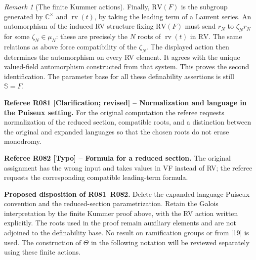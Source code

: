 \documentclass[12pt]{amsart}
\theoremstyle{remark}
\newtheorem{rem}[lem]{Remark}
\newcommand{\C}{\mathds{C}}
\newcommand{\rv}{\operatorname{rv}}
\newcommand{\RV}{\mathrm{RV}}
\newcommand{\Sbase}{\mathbb S}
\numberwithin{equation}{section}
\begin{document}
{\begin{rem}[The finite Kummer actions]
Finally, $\RV(F)$ is the subgroup generated by
$\C^\times$ and $\rv(t)$, by taking the leading term of a
Laurent series. An automorphism of the induced RV structure
fixing $\RV(F)$ must send $r_N$ to
$\zeta_Nr_N$ for some $\zeta_N\in\mu_N$: these are precisely
the $N$ roots of $\rv(t)$ in $\RV$.
The same relations as above force compatibility of the
$\zeta_N$. The displayed action then determines the
automorphism on every RV element. It agrees with the unique
valued-field automorphism constructed from that system.
This proves the second identification.
The parameter base for all these definability assertions is
still $\Sbase=F$.
\end{rem}
}
\medskip

{\normalfont\small\color{RefereePurple}
\noindent\textbf{Referee R081 [Clarification; revised] --
Normalization and language in the Puiseux setting.}
For the original computation the referee requests normalization
of the reduced section, compatible roots, and a distinction between
the original and expanded languages so that the chosen roots
do not erase monodromy.\par\medskip
\noindent\textbf{Referee R082 [Typo] -- Formula for a reduced section.}
The original assignment has the wrong input and takes values in
VF instead of RV; the referee requests the corresponding
compatible leading-term formula.\par}
\medskip

{\normalfont\small\color{ProposalOrange}
\noindent\textbf{Proposed disposition of R081--R082.}
Delete the expanded-language Puiseux convention and the
reduced-section parametrization. Retain the Galois interpretation
by the finite Kummer proof above, with the RV action written
explicitly. The roots used in the proof remain auxiliary elements
and are not adjoined to the definability base. No result on
ramification groups or from [19] is used. The construction of
$\Theta$ in the following notation will be reviewed separately
using these finite actions.}
\end{document}
